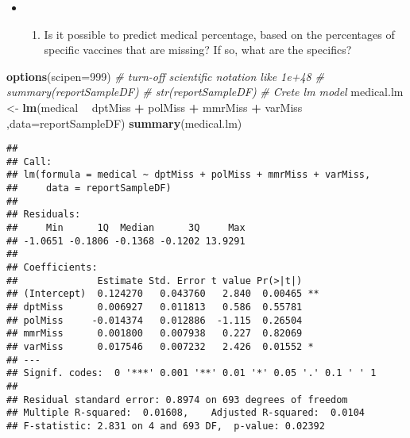 \documentclass[]{article}
\newenvironment{Shaded}{\begin{snugshade}}{\end{snugshade}}
\newcommand{\CommentTok}[1]{\textcolor[rgb]{0.56,0.35,0.01}{\textit{#1}}}
\newcommand{\DataTypeTok}[1]{\textcolor[rgb]{0.13,0.29,0.53}{#1}}
\newcommand{\DecValTok}[1]{\textcolor[rgb]{0.00,0.00,0.81}{#1}}
\newcommand{\KeywordTok}[1]{\textcolor[rgb]{0.13,0.29,0.53}{\textbf{#1}}}
\newcommand{\NormalTok}[1]{#1}
\newcommand{\OperatorTok}[1]{\textcolor[rgb]{0.81,0.36,0.00}{\textbf{#1}}}
\newcommand{\StringTok}[1]{\textcolor[rgb]{0.31,0.60,0.02}{#1}}
\providecommand{\tightlist}{%
  \setlength{\itemsep}{0pt}\setlength{\parskip}{0pt}}
\begin{document}
\begin{itemize}
\item
  \begin{enumerate}
  \def\labelenumi{\arabic{enumi}.}
  \setcounter{enumi}{10}
  \tightlist
  \item
    Is it possible to predict medical percentage, based on the
    percentages of specific vaccines that are missing? If so, what are
    the specifics?
  \end{enumerate}
\end{itemize}

\begin{Shaded}
\begin{Highlighting}[]
\KeywordTok{options}\NormalTok{(}\DataTypeTok{scipen=}\DecValTok{999}\NormalTok{)  }\CommentTok{# turn-off scientific notation like 1e+48}
\CommentTok{# summary(reportSampleDF)}
\CommentTok{# str(reportSampleDF)}
\CommentTok{# Crete lm model}
\NormalTok{medical.lm <-}\StringTok{ }\KeywordTok{lm}\NormalTok{(medical }\OperatorTok{~}\StringTok{ }\NormalTok{dptMiss }\OperatorTok{+}\StringTok{ }\NormalTok{polMiss }\OperatorTok{+}\StringTok{ }\NormalTok{mmrMiss }\OperatorTok{+}\StringTok{ }\NormalTok{varMiss ,}\DataTypeTok{data=}\NormalTok{reportSampleDF) }
\KeywordTok{summary}\NormalTok{(medical.lm)}
\end{Highlighting}
\end{Shaded}

\begin{verbatim}
## 
## Call:
## lm(formula = medical ~ dptMiss + polMiss + mmrMiss + varMiss, 
##     data = reportSampleDF)
## 
## Residuals:
##     Min      1Q  Median      3Q     Max 
## -1.0651 -0.1806 -0.1368 -0.1202 13.9291 
## 
## Coefficients:
##              Estimate Std. Error t value Pr(>|t|)   
## (Intercept)  0.124270   0.043760   2.840  0.00465 **
## dptMiss      0.006927   0.011813   0.586  0.55781   
## polMiss     -0.014374   0.012886  -1.115  0.26504   
## mmrMiss      0.001800   0.007938   0.227  0.82069   
## varMiss      0.017546   0.007232   2.426  0.01552 * 
## ---
## Signif. codes:  0 '***' 0.001 '**' 0.01 '*' 0.05 '.' 0.1 ' ' 1
## 
## Residual standard error: 0.8974 on 693 degrees of freedom
## Multiple R-squared:  0.01608,    Adjusted R-squared:  0.0104 
## F-statistic: 2.831 on 4 and 693 DF,  p-value: 0.02392
\end{verbatim}

\begin{Shaded}
\end{Shaded}
\end{document}

